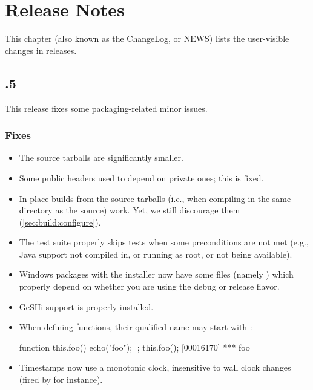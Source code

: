 
\chapter{Release Notes}
\label{sec:news}

This chapter (also known as the \urbi ChangeLog, or \urbi NEWS) lists the
user-visible changes in \usdk releases.

\section{.5}

This release fixes some packaging-related minor issues.
\subsection{Fixes}
\begin{itemize}
\item The source tarballs are significantly smaller.
\item Some public \Cxx headers used to depend on private ones; this is
  fixed.
\item In-place builds from the source tarballs (i.e., when compiling in the
  same directory as the source) work.  Yet, we still discourage them
  (\autoref{sec:build:configure}).
\item The test suite properly skips tests when some preconditions are not
  met (e.g., Java support not compiled in, or running as root, or
   not being available).
\item Windows packages with the installer now have some \us files (namely
  ) which properly depend on whether you are using the
  debug or release flavor.
\item GeSHi support is properly installed.
\item When defining functions, their qualified name may start with \this:
\begin{urbiscript}
function this.foo() { echo("foo"); }|;
this.foo();
[00016170] *** foo
\end{urbiscript}
\item Timestamps now use a monotonic clock, insensitive to wall clock
  changes (fired by  for instance).
\end{itemize}

